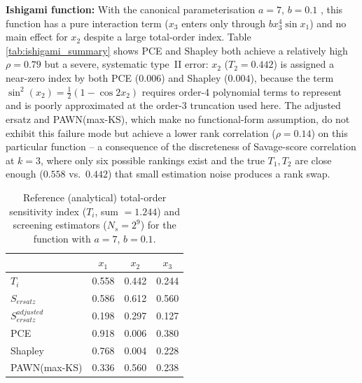 \documentclass[12pt]{article}
\begin{document}
\textbf{Ishigami function:} With the canonical parameterisation $a=7$, $b=0.1$ \citep{Saltelli2008}, this function has a pure interaction term ($x_3$ enters only through $bx_3^4\sin x_1$) and no main effect for $x_2$ despite a large total-order index. Table \ref{tab:ishigami_summary} shows PCE and Shapley both achieve a relatively high $\rho=0.79$ but a severe, systematic type~II error: $x_2$ ($T_2=0.442$) is assigned a near-zero index by both PCE ($0.006$) and Shapley ($0.004$), because the term $\sin^2(x_2) = \tfrac12(1-\cos 2x_2)$ requires order-4 polynomial terms to represent and is poorly approximated at the order-3 truncation used here. The adjusted ersatz and PAWN(max-KS), which make no functional-form assumption, do not exhibit this failure mode but achieve a lower rank correlation ($\rho=0.14$) on this particular function -- a consequence of the discreteness of Savage-score correlation at $k=3$, where only six possible rankings exist and the true $T_1, T_2$ are close enough ($0.558$ vs.\ $0.442$) that small estimation noise produces a rank swap.

\begin{table}[H]
\centering
\begin{tabular}{@{}lccc@{}} \toprule
 & $x_1$ & $x_2$ & $x_3$ \\ \midrule
$T_i$                   & 0.558 & 0.442 & 0.244 \\
$S_{ersatz}$            & 0.586 & 0.612 & 0.560 \\
$S^{adjusted}_{ersatz}$ & 0.198 & 0.297 & 0.127 \\
PCE                     & 0.918 & 0.006 & 0.380 \\
Shapley                 & 0.768 & 0.004 & 0.228 \\
PAWN(max-KS)            & 0.336 & 0.560 & 0.238 \\ \bottomrule
\end{tabular}
\caption{Reference (analytical) total-order sensitivity index ($T_i$, sum $=1.244$) and screening estimators ($N_s=2^9$) for the \cite{ishigami1990importance} function with $a=7$, $b=0.1$.}
\label{tab:ishigami_function}
\end{table}
\end{document}
